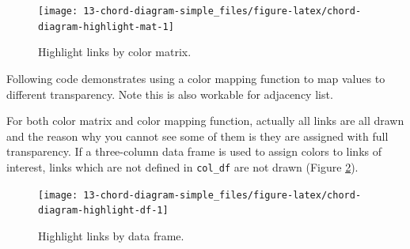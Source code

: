 \documentclass[]{book}
\newenvironment{Shaded}{\begin{snugshade}}{\end{snugshade}}
\newcommand{\KeywordTok}[1]{\textcolor[rgb]{0.13,0.29,0.53}{\textbf{#1}}}
\newcommand{\DataTypeTok}[1]{\textcolor[rgb]{0.13,0.29,0.53}{#1}}
\newcommand{\DecValTok}[1]{\textcolor[rgb]{0.00,0.00,0.81}{#1}}
\newcommand{\StringTok}[1]{\textcolor[rgb]{0.31,0.60,0.02}{#1}}
\newcommand{\ControlFlowTok}[1]{\textcolor[rgb]{0.13,0.29,0.53}{\textbf{#1}}}
\newcommand{\OperatorTok}[1]{\textcolor[rgb]{0.81,0.36,0.00}{\textbf{#1}}}
\newcommand{\NormalTok}[1]{#1}
\theoremstyle{definition}
\theoremstyle{definition}
\theoremstyle{remark}
\begin{document}
\begin{figure}

{\centering \texttt{[image: 13-chord-diagram-simple\_files/figure-latex/chord-diagram-highlight-mat-1]} 

}

\caption{Highlight links by color matrix.}\label{fig:chord-diagram-highlight-mat}
\end{figure}

Following code demonstrates using a color mapping function to map values
to different transparency. Note this is also workable for adjacency
list.

\begin{Shaded}
\end{Shaded}

For both color matrix and color mapping function, actually all links are
all drawn and the reason why you cannot see some of them is they are
assigned with full transparency. If a three-column data frame is used to
assign colors to links of interest, links which are not defined in
\texttt{col\_df} are not drawn (Figure
\ref{fig:chord-diagram-highlight-df}).

\begin{Shaded}
\end{Shaded}

\begin{figure}

{\centering \texttt{[image: 13-chord-diagram-simple\_files/figure-latex/chord-diagram-highlight-df-1]} 

}

\caption{Highlight links by data frame.}\label{fig:chord-diagram-highlight-df}
\end{figure}
\end{document}
